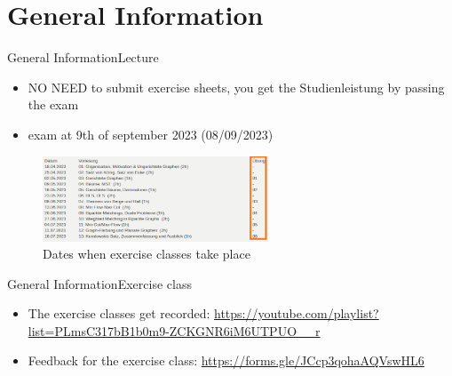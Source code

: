 
\section{General Information}

\begin{frame}{General Information}{Lecture}
  \begin{itemize}
    \item {\large \uppercase{\alert{no need}}} to submit exercise sheets, you get the \alert{Studienleistung} by \alert{passing the exam}
    \item \alert{exam} at 9th of september 2023 (08/09/2023)
  \end{itemize}
  \begin{figure}
    \includegraphics[width=0.6\textwidth]{./figures/dates.png}
    \caption{Dates when exercise classes take place}
  \end{figure}
\end{frame}

\begin{frame}{General Information}{Exercise class}
  \begin{itemize}
    \item The exercise classes get \alert{recorded}: \url{https://youtube.com/playlist?list=PLmsC317bB1b0m9-ZCKGNR6iM6UTPUO__r}
    \item \alert{Feedback} for the exercise class: \url{https://forms.gle/JCcp3qohaAQVswHL6}
  \end{itemize}
\end{frame}
